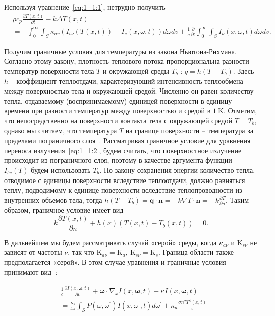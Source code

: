 Используя уравнение~\eqref{eq:1_1:1}, нетрудно получить
\[
    \begin{aligned}
        &\rho c_{p} \frac{\partial T(x, t)}{\partial t}
        -k \Delta T(x, t) = \\
        &=-\int_{0}^{\infty} \int_{S} \kappa_{a v}
        \left(I_{b \nu}(T(x, t))-I_{\nu}(x, \omega, t)\right) d \omega d v
        +\frac{1}{c} \frac{\partial}{\partial t}
        \int_{0}^{\infty} \int_{S} I_{\nu}(x, \omega, t) d \omega d v.
    \end{aligned}
\]

Получим граничные условия для температуры из закона Ньютона-Рихмана.
Согласно этому закону, плотность теплового потока пропорциональна разности температур
поверхности тела $T$ и окружающей среды $T_{b}$ : $q=h\left(T-T_{b}\right)$.
Здесь $h$ -- коэффициент теплоотдачи, характеризующий интенсивность
теплообмена между поверхностью тела и окружающей средой.
Численно он равен количеству тепла, отдаваемому (воспринимаемому) единицей поверхности в единицу времени
при разности температур между поверхностью и средой в $1 \mathrm{~K}$.
Отметим, что непосредственно
на поверхности контакта тела с окружающей средой $T=T_{b}$,
однако мы считаем, что температура $T$ на
границе поверхности -- температура за пределами пограничного слоя~\cite{Mazo}.
Рассматривая граничное условие для уравнения переноса излучения~\eqref{eq:1_1:2},
будем считать, что поверхностное излучение происходит из пограничного слоя,
поэтому в качестве аргумента функции $I_{b \nu}(T)$ будем использовать $T_{b}$.
По закону сохранения энергии количество тепла, отводимое с единицы поверхности
вследствие теплоотдачи, должно равняться теплу, подводимому к единице поверхности
вследствие теплопроводности из внутренних объемов тела, тогда
$h\left(T-T_{b}\right)=\mathbf{q} \cdot \mathbf{n} =
-k \nabla T \cdot \mathbf{n}=-k \frac{\partial T}{\partial n}$.
Таким образом, граничное условие имеет вид
\[
    k \frac{\partial T(x, t)}{\partial n}+h(x)\left(T(x, t)-T_{b}(x, t)\right)=0.
\]

В дальнейшем мы будем рассматривать случай «серой» среды,
когда $\kappa_{a \nu}$ и $\mathrm{K}_{s \nu}$ не зависят от частоты $\nu$,
так что $\mathrm{K}_{a \nu}=\mathrm{K}_{a}, \mathrm{~K}_{s \nu}=\mathrm{K}_{s}$.
Граница области также предполагается «серой».
В этом случае уравнения и граничные условия принимают вид~\cite{Kovtanyuk2014a}:

\begin{equation}
    \label{eq:1_1:3}
    \begin{aligned}
        & \frac{1}{c} \frac{\partial I(x, \boldsymbol{\omega}, t)}{\partial t}
        +\boldsymbol{\omega} \cdot \nabla_{x} I(x, \boldsymbol{\omega}, t)
        +\kappa I(x, \boldsymbol{\omega}, t)= \\
        & =\frac{\kappa_{s}}{4 \pi} \int_{S} P
        \left(\omega, \omega^{\prime}\right) I
        \left(x, \omega^{\prime}, t\right) d \omega^{\prime}
        +\kappa_{a} \frac{\sigma n^{2} T^{4}(x, t)}{\pi}
    \end{aligned}
\end{equation}

